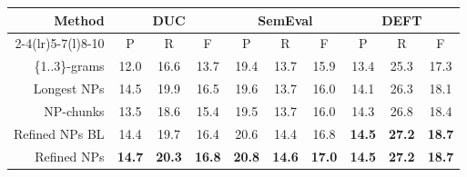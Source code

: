       \begin{table*}
        \centering
        \begin{tabular}{@{}rccccccccc@{}}
          \toprule
          \multirow{2}{*}[-2pt]{\textbf{Method}} & \multicolumn{3}{c}{\textbf{DUC}} & \multicolumn{3}{c}{\textbf{SemEval}} & \multicolumn{3}{c}{\textbf{DEFT}}\\
          \cmidrule(r){2-4}\cmidrule(lr){5-7}\cmidrule(l){8-10}
          & P & R & F & P & R & F & P & R & F\\
          \midrule
          \{1..3\}-grams & 12.0 & 16.6 & 13.7 & 19.4 & 13.7 & 15.9 & 13.4 & 25.3 & 17.3\\
          Longest NPs & 14.5 & 19.9 & 16.5 & 19.6 & 13.7 & 16.0 & 14.1 & 26.3 & 18.1\\
          NP-chunks & 13.5 & 18.6 & 15.4 & 19.5 & 13.7 & 16.0 & 14.3 & 26.8 & 18.4\\
          Refined NPs BL & 14.4 & 19.7 & 16.4 & 20.6 & 14.4 & 16.8 & \textbf{14.5} & \textbf{27.2} & \textbf{18.7}\\
          Refined NPs & \textbf{14.7} & \textbf{20.3} & \textbf{16.8} & \textbf{20.8} & \textbf{14.6} & \textbf{17.0}& \textbf{14.5} & \textbf{27.2} & \textbf{18.7}\\
          \bottomrule
        \end{tabular}
        \caption{Comparison of candidate selection methods, when 10 keyphrases
                 are extracted by \textbf{KEA}.
                 \label{tab:kea_results}}
      \end{table*}
